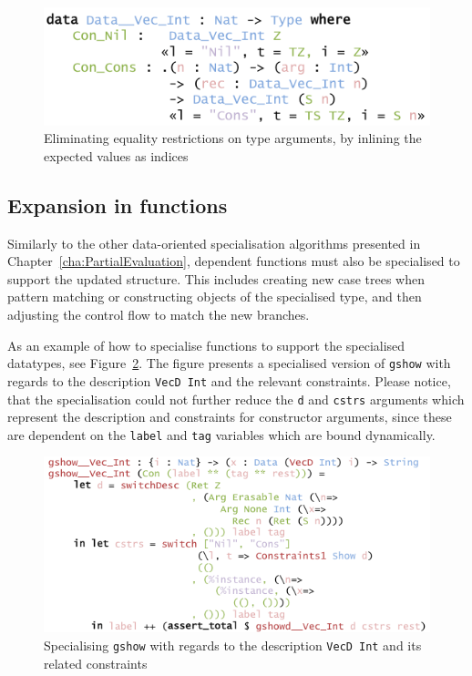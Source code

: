 \documentclass{ituthesis}
\newcommand{\tttype}[1]{\textcolor{type-color}{\texttt{#1}}}
\newcommand{\ttdec}[1]{\textcolor{declared-var-color}{\texttt{#1}}}
\newcommand{\ttvar}[1]{\textcolor{local-var-color}{\texttt{#1}}}
\theoremstyle{break}
\begin{document}
\begin{figure}[ht]
\begin{center}
    \includegraphics[scale=0.5]{Figures/PESubst.png}
\end{center}
\caption{Eliminating equality restrictions on type arguments, by inlining the expected values as indices}
\label{fig:pesubst}
\end{figure}


\subsection{Expansion in functions}
\label{sub:Expansion in functions}
Similarly to the other data-oriented specialisation algorithms presented in Chapter~\ref{cha:PartialEvaluation}, dependent functions must also be specialised to support the updated structure.
This includes creating new case trees when pattern matching or constructing objects of the specialised type, and then adjusting the control flow to match the new branches.

As an example of how to specialise functions to support the specialised datatypes, see Figure~\ref{fig:genericshow1}.
The figure presents a specialised version of \ttdec{gshow} with regards to the description \ttdec{VecD}~\tttype{Int} and the relevant constraints.
Please notice, that the specialisation could not further reduce the \ttvar{d} and \ttvar{cstrs} arguments which represent the description and constraints for constructor arguments,
since these are dependent on the \ttvar{label} and \ttvar{tag} variables which are bound dynamically.

\begin{figure}[ht]
\begin{center}
    \includegraphics[scale=0.5]{Figures/PEGenericShow1.png}
\end{center}
\caption{Specialising \ttdec{gshow} with regards to the description \ttdec{VecD}~\tttype{Int} and its related constraints}
\label{fig:genericshow1}
\end{figure}
\end{document}
